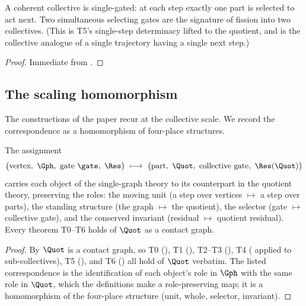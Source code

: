 \begin{corollary}
\label{cor:single-valued}
A coherent collective is single-gated: at each step exactly one part is selected
to act next. Two simultaneous selecting gates are the signature of fission into
two collectives. \textup{(}This is T5's single-step determinacy lifted to the
quotient, and is the collective analogue of a single trajectory having a single
next step.\textup{)}
\end{corollary}

\begin{proof}
Immediate from .
\end{proof}

\subsection{The scaling homomorphism}

The constructions of the paper recur at the collective scale. We record the
correspondence as a homomorphism of four-place structures.

\begin{proposition}
\label{prop:homomorphism}
The assignment
\[
\bigl(\text{vertex},\ \Gph,\ \text{gate }\gate,\ \Res\bigr)
\ \longmapsto\
\bigl(\text{part},\ \Quot,\ \text{collective gate},\ \Res(\Quot)\bigr)
\]
carries each object of the single-graph theory to its counterpart in the quotient
theory, preserving the roles: the moving unit \textup{(}a step over vertices
$\mapsto$ a step over parts\textup{)}, the standing structure \textup{(}the graph
$\mapsto$ the quotient\textup{)}, the selector \textup{(}gate $\mapsto$ collective
gate\textup{)}, and the conserved invariant \textup{(}residual $\mapsto$ quotient
residual\textup{)}. Every theorem T0--T6 holds of $\Quot$ as a contact graph.
\end{proposition}

\begin{proof}
By  $\Quot$ is a contact graph, so T0
(), T1 (), T2--T3
(), T4 (
applied to sub-collectives), T5 (\Cref{thm:gate-necessary}), and T6
(\Cref{thm:nonreturn}) all hold of $\Quot$ verbatim. The listed correspondence is
the identification of each object's role in $\Gph$ with the same role in $\Quot$,
which the definitions make a role-preserving map; it is a homomorphism of the
four-place structure (unit, whole, selector, invariant).
\end{proof}

